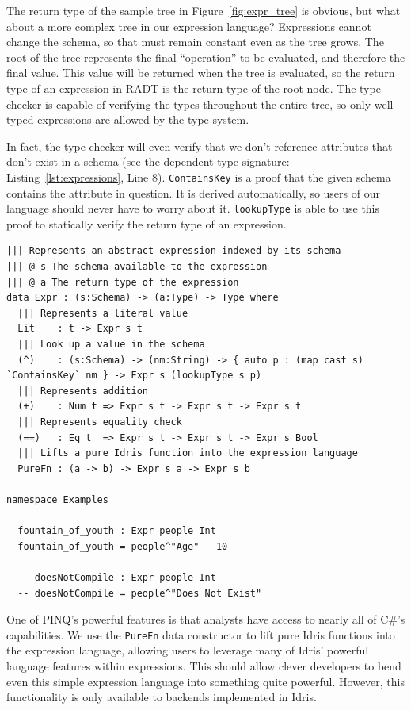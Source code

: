\documentclass[12pt]{report}
\begin{document}

The return type of the sample tree in Figure~\ref{fig:expr_tree} is obvious, but what about a more complex tree in our expression language?
Expressions cannot change the schema, so that must remain constant even as the tree grows.
The root of the tree represents the final ``operation'' to be evaluated, and therefore the final value.
This value will be returned when the tree is evaluated, so the return type of an expression in RADT is the return type of the root node.
The type-checker is capable of verifying the types throughout the entire tree, so only well-typed expressions are allowed by the type-system.

In fact, the type-checker will even verify that we don't reference attributes that don't exist in a schema (see the dependent type signature: Listing~\ref{lst:expressions}, Line 8).
\texttt{ContainsKey} is a proof that the given schema contains the attribute in question.
It is derived automatically, so users of our language should never have to worry about it.
\texttt{lookupType} is able to use this proof to statically verify the return type of an expression.

\begin{lstlisting}[caption={Abstract representation of toy expression language},label={lst:expressions}]
||| Represents an abstract expression indexed by its schema
||| @ s The schema available to the expression
||| @ a The return type of the expression
data Expr : (s:Schema) -> (a:Type) -> Type where
  ||| Represents a literal value
  Lit    : t -> Expr s t
  ||| Look up a value in the schema
  (^)    : (s:Schema) -> (nm:String) -> { auto p : (map cast s) `ContainsKey` nm } -> Expr s (lookupType s p)
  ||| Represents addition
  (+)    : Num t => Expr s t -> Expr s t -> Expr s t
  ||| Represents equality check
  (==)   : Eq t  => Expr s t -> Expr s t -> Expr s Bool
  ||| Lifts a pure Idris function into the expression language
  PureFn : (a -> b) -> Expr s a -> Expr s b

namespace Examples

  fountain_of_youth : Expr people Int
  fountain_of_youth = people^"Age" - 10

  -- doesNotCompile : Expr people Int
  -- doesNotCompile = people^"Does Not Exist"
\end{lstlisting}

One of PINQ's powerful features is that analysts have access to nearly all of C\#'s capabilities.
We use the \texttt{PureFn} data constructor to lift pure Idris functions into the expression language, allowing users to leverage many of Idris' powerful language features within expressions.
This should allow clever developers to bend even this simple expression language into something quite powerful.
However, this functionality is only available to backends implemented in Idris.
\end{document}
